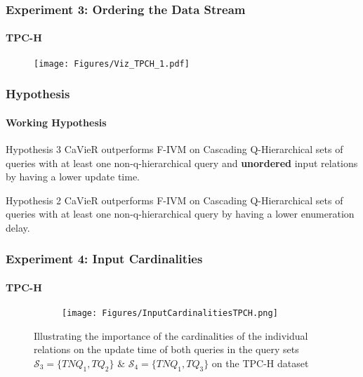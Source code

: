 \documentclass[
	11pt, %
]{beamer}
\begin{document}
\begin{frame}
	\frametitle{Experiment 3: Ordering the Data Stream}
	\framesubtitle{TPC-H}
	\begin{figure}
		\texttt{[image: Figures/Viz\_TPCH\_1.pdf]}
	\end{figure}
\end{frame}

\begin{frame}
	\frametitle{Hypothesis}
	\framesubtitle{Working Hypothesis}
	\begin{block}{Hypothesis 3}
			CaVieR outperforms F-IVM on Cascading Q-Hierarchical sets of queries with at least one non-q-hierarchical query and \textbf{unordered} input relations by having a lower update time.
	\end{block}
		\begin{block}{Hypothesis 2}
		CaVieR outperforms F-IVM on Cascading Q-Hierarchical sets of queries with at least one non-q-hierarchical query by having a lower enumeration delay.
	\end{block}
	
\end{frame}

\begin{frame}
	\frametitle{Experiment 4: Input Cardinalities}
	\framesubtitle{TPC-H}
	\begin{figure}

		\begin{minipage}{0.25\textwidth}
		\end{minipage}
		\begin{minipage}{0.74\textwidth}
			\begin{figure}
				\centering
				\texttt{[image: Figures/InputCardinalitiesTPCH.png]}
			\end{figure}
		\end{minipage}
	\caption{Illustrating the importance of the cardinalities of the individual relations on the update time of both queries in the query sets $\mathcal{S}_3 = \{TNQ_1, TQ_2\}$ \& $\mathcal{S}_4 = \{TNQ_1, TQ_3\}$ on the TPC-H dataset}
\label{fig:inputCardinalitiesTpch}
	\end{figure}
\end{frame}
\end{document}
